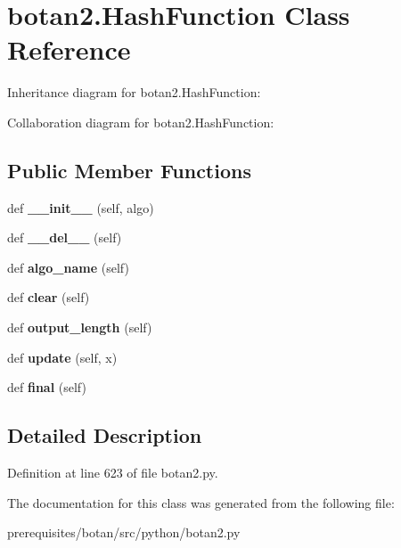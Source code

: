 \hypertarget{classbotan2_1_1_hash_function}{}\section{botan2.\+Hash\+Function Class Reference}
\label{classbotan2_1_1_hash_function}


Inheritance diagram for botan2.\+Hash\+Function\+:


Collaboration diagram for botan2.\+Hash\+Function\+:
\subsection*{Public Member Functions}
\begin{DoxyCompactItemize}
\item 
\mbox{\label{classbotan2_1_1_hash_function_aed4c94ca4ba45e7945d97dd72470dab0}} 
def {\bfseries \+\_\+\+\_\+init\+\_\+\+\_\+} (self, algo)
\item 
\mbox{\label{classbotan2_1_1_hash_function_ac1d215b04705c47b2440b98244e80b22}} 
def {\bfseries \+\_\+\+\_\+del\+\_\+\+\_\+} (self)
\item 
\mbox{\label{classbotan2_1_1_hash_function_af974a83a1d55a87dbd6c6d8da7b02467}} 
def {\bfseries algo\+\_\+name} (self)
\item 
\mbox{\label{classbotan2_1_1_hash_function_a1303ef962cfbf7dc26cdfa9f3e003c9a}} 
def {\bfseries clear} (self)
\item 
\mbox{\label{classbotan2_1_1_hash_function_a089c6dfd140a3a573706c41f43594a64}} 
def {\bfseries output\+\_\+length} (self)
\item 
\mbox{\label{classbotan2_1_1_hash_function_a16422930ca0ae628741e88ef39612cc3}} 
def {\bfseries update} (self, x)
\item 
\mbox{\label{classbotan2_1_1_hash_function_af0591a1920d3ccd97bf4978089dd1e19}} 
def {\bfseries final} (self)
\end{DoxyCompactItemize}


\subsection{Detailed Description}


Definition at line 623 of file botan2.\+py.



The documentation for this class was generated from the following file\+:\begin{DoxyCompactItemize}
\item 
prerequisites/botan/src/python/botan2.\+py\end{DoxyCompactItemize}
